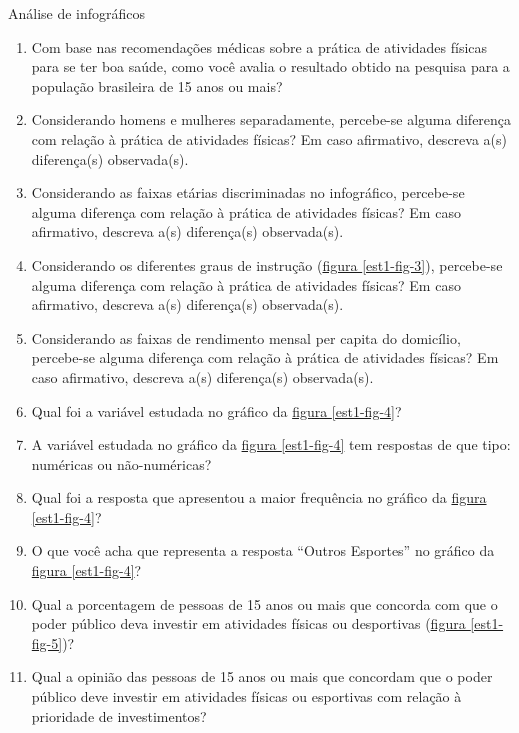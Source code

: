 \begin{task}{ Análise de infográficos}
\begin{enumerate}
\item {} 
Com base nas recomendações médicas sobre a prática de atividades físicas para se ter boa saúde, como você avalia o resultado obtido na pesquisa para a população brasileira de 15 anos ou mais?

\item {} 
Considerando homens e mulheres separadamente, percebe-se alguma diferença com relação à prática de atividades físicas? Em caso afirmativo, descreva a(s) diferença(s) observada(s).

\item {} 
Considerando as faixas etárias discriminadas no infográfico, percebe-se alguma diferença com relação à prática de atividades físicas? Em caso afirmativo, descreva a(s) diferença(s) observada(s).

\item {} 
Considerando os diferentes graus de instrução (\hyperref[est1-fig-3]{figura \ref{est1-fig-3}}), percebe-se alguma diferença com relação à prática de atividades físicas? Em caso afirmativo, descreva a(s) diferença(s) observada(s).

\item {} 
Considerando as faixas de rendimento mensal per capita do domicílio, percebe-se alguma diferença com relação à prática de atividades físicas? Em caso afirmativo, descreva a(s) diferença(s) observada(s).

\item {} 
Qual foi a variável estudada no gráfico da \hyperref[est1-fig-4]{figura \ref{est1-fig-4}}?

\item {} 
A variável estudada no gráfico da \hyperref[est1-fig-4]{figura \ref{est1-fig-4}} tem respostas de que tipo: numéricas ou não-numéricas?

\item {} 
Qual foi a resposta que apresentou a maior frequência no gráfico da \hyperref[est1-fig-4]{figura \ref{est1-fig-4}}?

\item {} 
O que você acha que representa a resposta “Outros Esportes” no gráfico da \hyperref[est1-fig-4]{figura \ref{est1-fig-4}}?

\item {} 
Qual a porcentagem de pessoas de 15 anos ou mais que concorda com que o poder público deva investir em atividades físicas ou desportivas (\hyperref[est1-fig-5]{figura \ref{est1-fig-5}})?

\item {} 
Qual a opinião das pessoas de 15 anos ou mais que concordam que o poder público deve investir em atividades físicas ou esportivas com relação à prioridade de investimentos?


\end{enumerate}
\end{task}
